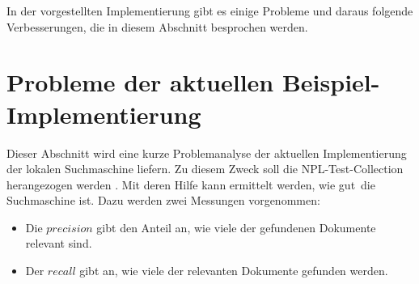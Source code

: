 In der vorgestellten Implementierung gibt es einige Probleme und daraus folgende Verbesserungen, die in diesem Abschnitt besprochen werden.
\begin{comment}
Die folgende Liste dient nur zur Dokumentation der vorhanden Probleme und wird später durch ausführlichere Erläuterungen und Beispielen ersetzt.
\begin{itemize}
	\item BuildIndex Laufzeit verringern
	\begin{itemize}
		\item Mit Threads parallelisieren?
	\end{itemize}
	\item Invertierten Index persistieren, damit er nicht immer wieder neu aufgebaut werden muss
	\begin{itemize}
		\item Wie soll persistiert werden?
		\item Wie sollen nur Verzeichnisse mit Änderungen (Löschung/Erstellung von PDF) erkannt werden?
		\item Wann sollen Aktualisierungen durchgeführt werden?
	\end{itemize}
	\item *.dat Dateien werden als PDFs erkannt
	\item Implementierung von Stemming?
	\item RAM-Auslastung durch Speicherung der Terme der Dokumente als Liste in Document-Klasse hoch. Verlangsamt BuildINdex, beschleunigt aber Retrieve.
	\item Kontext der Wörter wird nicht beachtet (Bags of Words Modell)
	\begin{itemize}
		\item N-Gramm nutzen? (Speichern von zwei aufeinander treffende Wörter als Token)
	\end{itemize}
\end{itemize}
\end{comment}

\section{Probleme der aktuellen Beispiel-Implementierung}
Dieser Abschnitt wird eine kurze Problemanalyse der aktuellen Implementierung der lokalen Suchmaschine liefern. Zu diesem Zweck soll die NPL-Test-Collection herangezogen werden \cite{npl_test_collection}. Mit deren Hilfe kann ermittelt werden, wie \glqq gut\grqq\ die Suchmaschine ist. Dazu werden zwei Messungen vorgenommen:
\begin{itemize}
	\item Die $precision$ gibt den Anteil an, wie viele der gefundenen Dokumente relevant sind.
	\item Der $recall$ gibt an, wie viele der relevanten Dokumente gefunden werden.
\end{itemize}

